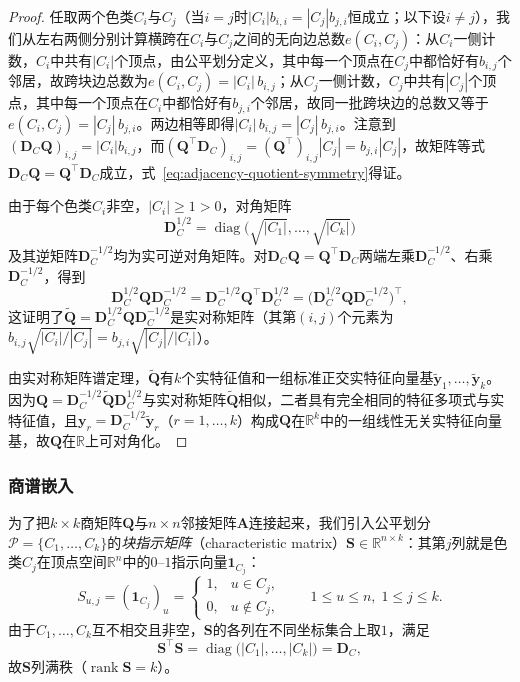 \begin{proof}
任取两个色类$C_i$与$C_j$（当$i=j$时$|C_i|b_{i,i}=|C_j|b_{j,i}$恒成立；以下设$i\neq j$），我们从左右两侧分别计算横跨在$C_i$与$C_j$之间的无向边总数$e(C_i,C_j)$：从$C_i$一侧计数，$C_i$中共有$|C_i|$个顶点，由公平划分定义，其中每一个顶点在$C_j$中都恰好有$b_{i,j}$个邻居，故跨块边总数为$e(C_i,C_j)=|C_i|\,b_{i,j}$；从$C_j$一侧计数，$C_j$中共有$|C_j|$个顶点，其中每一个顶点在$C_i$中都恰好有$b_{j,i}$个邻居，故同一批跨块边的总数又等于$e(C_i,C_j)=|C_j|\,b_{j,i}$。两边相等即得$|C_i|\,b_{i,j}=|C_j|\,b_{j,i}$。注意到$(\bm D_C\bm Q)_{i,j}=|C_i|b_{i,j}$，而$(\bm Q^\top\bm D_C)_{i,j}=(\bm Q^\top)_{i,j}|C_j|=b_{j,i}|C_j|$，故矩阵等式$\bm D_C\bm Q=\bm Q^\top\bm D_C$成立，式~\eqref{eq:adjacency-quotient-symmetry}得证。

由于每个色类$C_i$非空，$|C_i|\geq 1>0$，对角矩阵
\[
\bm D_C^{1/2}=\operatorname{diag}\bigl(\sqrt{|C_1|},\ldots,\sqrt{|C_k|}\bigr)
\]
及其逆矩阵$\bm D_C^{-1/2}$均为实可逆对角矩阵。对$\bm D_C\bm Q=\bm Q^\top\bm D_C$两端左乘$\bm D_C^{-1/2}$、右乘$\bm D_C^{-1/2}$，得到
\[
\bm D_C^{1/2}\bm Q\bm D_C^{-1/2}
=\bm D_C^{-1/2}\bm Q^\top\bm D_C^{1/2}
=\bigl(\bm D_C^{1/2}\bm Q\bm D_C^{-1/2}\bigr)^\top,
\]
这证明了$\widetilde{\bm Q}=\bm D_C^{1/2}\bm Q\bm D_C^{-1/2}$是实对称矩阵（其第$(i,j)$个元素为$b_{i,j}\sqrt{|C_i|/|C_j|}=b_{j,i}\sqrt{|C_j|/|C_i|}$）。

由实对称矩阵谱定理，$\widetilde{\bm Q}$有$k$个实特征值和一组标准正交实特征向量基$\tilde{\bm y}_1,\ldots,\tilde{\bm y}_k$。因为$\bm Q=\bm D_C^{-1/2}\widetilde{\bm Q}\bm D_C^{1/2}$与实对称矩阵$\widetilde{\bm Q}$相似，二者具有完全相同的特征多项式与实特征值，且$\bm y_r=\bm D_C^{-1/2}\tilde{\bm y}_r$（$r=1,\ldots,k$）构成$\bm Q$在$\mathbb R^k$中的一组线性无关实特征向量基，故$\bm Q$在$\mathbb R$上可对角化。
\end{proof}

\subsubsection{商谱嵌入}
\label{sec:adjacency-quotient-spectrum-embedding}

为了把$k\times k$商矩阵$\bm Q$与$n\times n$邻接矩阵$\bm A$连接起来，我们引入公平划分$\mathcal P=\{C_1,\ldots,C_k\}$的\emph{块指示矩阵}（characteristic matrix）$\bm S\in\mathbb R^{n\times k}$：其第$j$列就是色类$C_j$在顶点空间$\mathbb R^n$中的$0$--$1$指示向量$\bm 1_{C_j}$：
\[
S_{u,j}=(\bm 1_{C_j})_u=
\begin{cases}
1,& u\in C_j,\\
0,& u\notin C_j,
\end{cases}
\qquad 1\leq u\leq n,\;1\leq j\leq k.
\]
由于$C_1,\ldots,C_k$互不相交且非空，$\bm S$的各列在不同坐标集合上取$1$，满足
\[
\bm S^\top\bm S=\operatorname{diag}\bigl(|C_1|,\ldots,|C_k|\bigr)=\bm D_C,
\]
故$\bm S$列满秩（$\operatorname{rank}\bm S=k$）。

